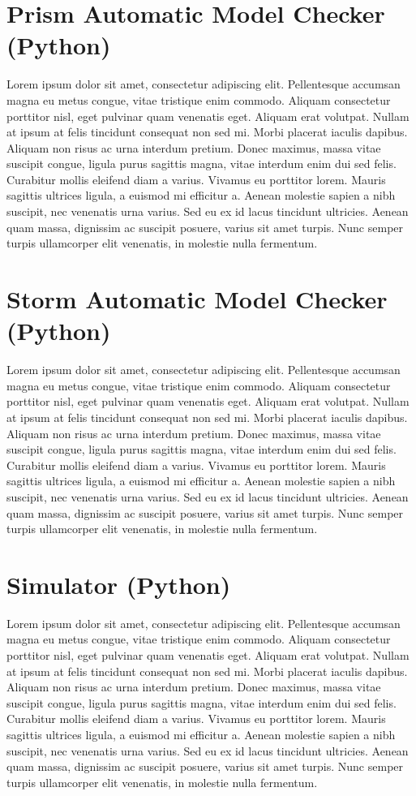 \section{Prism Automatic Model Checker (Python)}

Lorem ipsum dolor sit amet, consectetur adipiscing elit. Pellentesque accumsan magna eu metus congue, vitae tristique enim commodo. Aliquam consectetur porttitor nisl, eget pulvinar quam venenatis eget. Aliquam erat volutpat. Nullam at ipsum at felis tincidunt consequat non sed mi. Morbi placerat iaculis dapibus. Aliquam non risus ac urna interdum pretium. Donec maximus, massa vitae suscipit congue, ligula purus sagittis magna, vitae interdum enim dui sed felis. Curabitur mollis eleifend diam a varius. Vivamus eu porttitor lorem. Mauris sagittis ultrices ligula, a euismod mi efficitur a. Aenean molestie sapien a nibh suscipit, nec venenatis urna varius. Sed eu ex id lacus tincidunt ultricies. Aenean quam massa, dignissim ac suscipit posuere, varius sit amet turpis. Nunc semper turpis ullamcorper elit venenatis, in molestie nulla fermentum.

\section{Storm Automatic Model Checker (Python)}

Lorem ipsum dolor sit amet, consectetur adipiscing elit. Pellentesque accumsan magna eu metus congue, vitae tristique enim commodo. Aliquam consectetur porttitor nisl, eget pulvinar quam venenatis eget. Aliquam erat volutpat. Nullam at ipsum at felis tincidunt consequat non sed mi. Morbi placerat iaculis dapibus. Aliquam non risus ac urna interdum pretium. Donec maximus, massa vitae suscipit congue, ligula purus sagittis magna, vitae interdum enim dui sed felis. Curabitur mollis eleifend diam a varius. Vivamus eu porttitor lorem. Mauris sagittis ultrices ligula, a euismod mi efficitur a. Aenean molestie sapien a nibh suscipit, nec venenatis urna varius. Sed eu ex id lacus tincidunt ultricies. Aenean quam massa, dignissim ac suscipit posuere, varius sit amet turpis. Nunc semper turpis ullamcorper elit venenatis, in molestie nulla fermentum.

\section{Simulator (Python)}

Lorem ipsum dolor sit amet, consectetur adipiscing elit. Pellentesque accumsan magna eu metus congue, vitae tristique enim commodo. Aliquam consectetur porttitor nisl, eget pulvinar quam venenatis eget. Aliquam erat volutpat. Nullam at ipsum at felis tincidunt consequat non sed mi. Morbi placerat iaculis dapibus. Aliquam non risus ac urna interdum pretium. Donec maximus, massa vitae suscipit congue, ligula purus sagittis magna, vitae interdum enim dui sed felis. Curabitur mollis eleifend diam a varius. Vivamus eu porttitor lorem. Mauris sagittis ultrices ligula, a euismod mi efficitur a. Aenean molestie sapien a nibh suscipit, nec venenatis urna varius. Sed eu ex id lacus tincidunt ultricies. Aenean quam massa, dignissim ac suscipit posuere, varius sit amet turpis. Nunc semper turpis ullamcorper elit venenatis, in molestie nulla fermentum.
